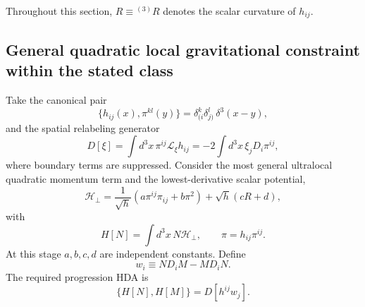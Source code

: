 \documentclass[11pt]{article}
\begin{document}
Throughout this section, $R\equiv{}^{(3)}R$ denotes the scalar curvature of $h_{ij}$.

\subsection{General quadratic local gravitational constraint within the stated class}

Take the canonical pair
\begin{equation}
    \{h_{ij}(x),\pi^{kl}(y)\}
    =\delta_{(i}^{k}\delta_{j)}^{l}\,\delta^3(x-y),
    \label{eq:canonical_pair}
\end{equation}
and the spatial relabeling generator
\begin{equation}
    D[\xi]
    =\int d^3x\,\pi^{ij}\mathcal L_\xi h_{ij}
    =-2\int d^3x\,\xi_jD_i\pi^{ij},
    \label{eq:D_generator}
\end{equation}
where boundary terms are suppressed. Consider the most general ultralocal quadratic momentum term and the lowest-derivative scalar potential,
\begin{equation}
\boxed{
\mathcal H_\perp
=\frac{1}{\sqrt h}
\left(a\pi^{ij}\pi_{ij}+b\pi^2\right)
+\sqrt h\left(cR+d\right),}
\label{eq:abcd_constraint}
\end{equation}
with
\begin{equation}
    H[N]=\int d^3x\,N\mathcal H_\perp,
    \qquad
    \pi=h_{ij}\pi^{ij}.
\end{equation}
At this stage $a,b,c,d$ are independent constants. Define
\begin{equation}
    w_i\equiv ND_iM-MD_iN.
    \label{eq:w_def}
\end{equation}
The required progression HDA is
\begin{equation}
    \{H[N],H[M]\}
    =D[h^{ij}w_j].
    \label{eq:required_HDA}
\end{equation}
\end{document}
